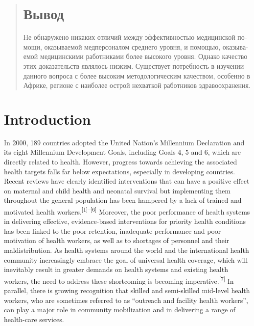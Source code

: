 \documentclass{article}
\begin{document}
\begin{otherlanguage}{russian}
\begin{abstract}
\section{Вывод}

Не обнаружено
никаких
отличий между
эффективностью
медицинской
помощи,
оказываемой
медперсоналом
среднего
уровня, и
помощью,
оказываемой
медицинскими
работниками
более
высокого
уровня. Однако
качество этих
доказательств
являлось
низким.
Существует
потребность в
изучении
данного
вопроса с
более высоким
методологическим
качеством,
особенно в
Африке,
регионе с
наиболее
острой
нехваткой
работников
здравоохранения.

\end{abstract}
\end{otherlanguage}
\endgroup
\section{Introduction}

In 2000, 189 countries adopted the United Nation's Millennium Declaration and
its eight
Millennium Development Goals, including Goals 4, 5 and 6, which are directly
related to health.
However, progress towards achieving the associated health targets falls far
below expectations,
especially in developing countries. Recent reviews have clearly identified
interventions that can
have a positive effect on maternal and child health and neonatal survival but
implementing them
throughout the general population has been hampered by a lack of trained and
motivated health
workers.\textsuperscript{[}\textsuperscript{1}\textsuperscript{]}\textsuperscript{–}\textsuperscript{[}\textsuperscript{6}\textsuperscript{]}
Moreover, the poor performance of health systems in delivering
effective, evidence-based interventions for priority health conditions has been
linked to the poor
retention, inadequate performance and poor motivation of health workers, as well
as to shortages of
personnel and their maldistribution. As health systems around the world and the
international health
community increasingly embrace the goal of universal health coverage, which will
inevitably result
in greater demands on health systems and existing health workers, the need to
address these
shortcoming is becoming imperative.\textsuperscript{[}\textsuperscript{7}\textsuperscript{]}
In parallel,
there is growing recognition that skilled and semi-skilled mid-level health
workers, who are
sometimes referred to as “outreach and facility health workers”, can play a
major role
in community mobilization and in delivering a range of health-care services.
\end{document}
